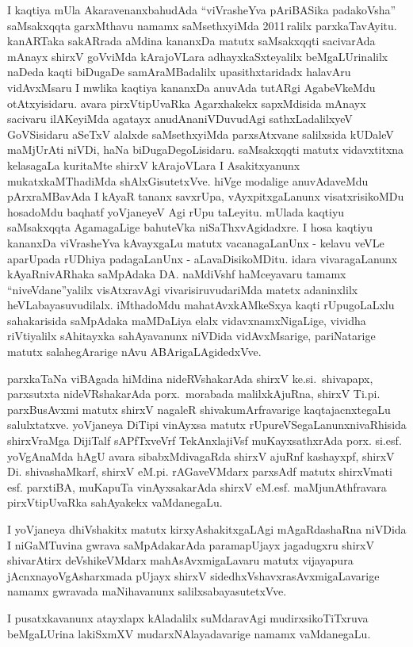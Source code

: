 I kaqtiya mUla AkaravenanxbahudAda ``viVrasheYva pAriBASika padakoVsha'' saMsakxqqta garxMthavu namamx saMsethxyiMda 2011\,ralilx parxkaTavAyitu. kanARTaka sakARrada aMdina kananxDa matutx saMsakxqqti sacivarAda mAnayx shirxV goVviMda kArajoVLara adhayxkaSxte\-yalilx beMgaLUrinalilx naDeda kaqti biDugaDe samAraMBadalilx upasithxtaridadx halavAru vidAvxMsaru I mwlika kaqtiya kananxDa anuvAda \hbox{tutARgi} AgabeVkeMdu otAtxyisidaru. avara pirxVtipUvaRka Agarxhakekx sapxMdisida mAnayx sacivaru ilAKeyiMda agatayx anudAna\break niVDuvudAgi sathxLadalilxyeV GoVSisidaru aSeTxV alalxde saMsethxyiMda parxsAtxvane salilxsida kUDaleV maMjUrAti niVDi, haNa biDugaDegoLisidaru. saMsakxqqti matutx vidavxtitxna kelasagaLa kuritaMte shirxV kArajoVLara I Asakitxyanunx mukatxkaMThadiMda shAlxGisutetxVve. hiVge modalige anuvAdaveMdu pArxraMBavAda I kAyaR tananx savxrUpa, vAyxpitxgaLanunx visatxrisikoMDu hosadoMdu baqhatf \hbox{yoVjaneyeV} Agi rUpu taLeyitu. mUlada kaqtiyu saMsakxqqta AgamagaLige bahuteVka niSaThxvAgidadxre. I hosa kaqtiyu kananxDa \hbox{viVrasheYva} kAvayxgaLu matutx vacanagaLanUnx - kelavu veVLe aparUpada rUDhiya padagaLanUnx - aLavaDisikoMDitu. idara vivara\-gaLanunx kAyaR\-nivARhaka saMpAdaka DA. naMdiVshf haMceyavaru tamamx ``niveVdane''yalilx visAtxravAgi vivarisiruvudariMda matetx adaninxlilx heVLabayasuvudilalx. iMthadoMdu mahatAvxkAMkeSxya kaqti rUpugoLaLxlu sahakarisida saMpAdaka maMDaLiya elalx vidavxnamxNi\-gaLige, vividha riVtiyalilx sAhitayxka sahAyavanunx niVDida vidAvxMsarige, pariNatarige matutx salahegArarige nAvu ABAri\-gaLA\-gidedxVve.

\smallskip

parxkaTaNa viBAgada hiMdina nideRVshakarAda shirxV ke.si.~shivapapx, parxsutxta nideVRshakarAda porx.~morabada malilxkAjuRna, shirxV Ti.pi. parxBusAvxmi matutx shirxV nagaleR shivakumArfravarige kaqtajacnxtegaLu salulxtatxve. yoVjaneya DiTipi vinAyxsa matutx rUpureVSegaLanunx\break nivaRhisida shirxVraMga DijiTalf sAPfTxveVrf TekAnxlajiVsf muKayxsathxrAda porx. si.esf. \hbox{yoVgAnaMda} hAgU avara sibabxMdivagaRda shirxV ajuRnf kashayxpf, shirxV Di. shivashaMkarf, shirxV eM.pi. rAGaveVMdarx parxsAdf matutx shirxVmati esf. parxtiBA, muKapuTa vinAyxsakarAda shirxV eM.esf. maMjunAthfravara pirxVtipUvaRka sahAyakekx vaMdanegaLu.

\smallskip

I yoVjaneya dhiVshakitx matutx kirxyAshakitxgaLAgi mAgaRdashaRna niVDida I niGaMTuvina gwrava saMpAdakarAda paramapUjayx jagadugxru shirxV shivarAtirx deVshikeVMdarx mahAsAvxmigaLavaru matutx vijayapura jAcnxnayoVgAsharxmada pUjayx shirxV sidedhxVshavxrasAvxmigaLavarige namamx gwravada maNihavanunx salilxsa\-bayasutetxVve.

\smallskip

I pusatxkavanunx atayxlapx kAladalilx suMdaravAgi mudirxsikoTiTxruva beMgaLUrina lakiSxmXV mudarxNAlayadavarige namamx vaMdanegaLu.

